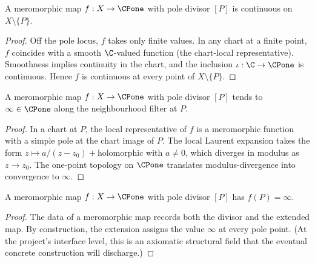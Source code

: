 \begin{lemma}
\label{lem:meromorphic-continuous-off-pole}
A meromorphic map \(f:X\to\CPone\) with pole divisor \([P]\) is
continuous on \(X\setminus\{P\}\).
\leanok
\end{lemma}
\begin{proof}\leanok
Off the pole locus, \(f\) takes only finite values. In any chart at
a finite point, \(f\) coincides with a smooth \(\C\)-valued
function (the chart-local representative). Smoothness implies
continuity in the chart, and the inclusion \(\iota:\C\to\CPone\) is
continuous. Hence \(f\) is continuous at every point of
\(X\setminus\{P\}\).
\end{proof}

\begin{lemma}
\label{lem:meromorphic-tends-to-infty-at-simple-pole}
A meromorphic map \(f:X\to\CPone\) with pole divisor \([P]\) tends
to \(\infty\in\CPone\) along the neighbourhood filter at \(P\).
\leanok
\end{lemma}
\begin{proof}\leanok
In a chart at \(P\), the local representative of \(f\) is a
meromorphic function with a simple pole at the chart image of \(P\).
The local Laurent expansion takes the form
\(z\mapsto a/(z-z_{0})+\text{holomorphic}\) with \(a\neq 0\), which
diverges in modulus as \(z\to z_{0}\). The one-point topology on
\(\CPone\) translates modulus-divergence into convergence to
\(\infty\).
\end{proof}

\begin{lemma}
\label{lem:meromorphic-value-at-pole}

A meromorphic map \(f:X\to\CPone\) with pole divisor \([P]\) has
\(f(P)=\infty\).
\leanok
\end{lemma}
\begin{proof}\leanok
The data of a meromorphic map records both the divisor and the
extended map. By construction, the extension assigns the value
\(\infty\) at every pole point. (At the project's interface level,
this is an axiomatic structural field that the eventual concrete
construction will discharge.)
\end{proof}


